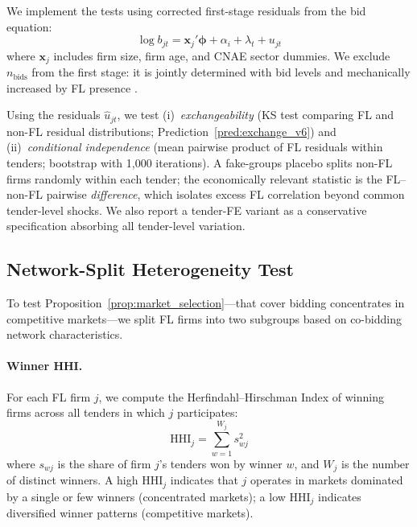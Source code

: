 We implement the \citet{bajari2003deciding} tests using corrected
first-stage residuals from the bid equation:
\begin{equation}
  \log b_{jt} = \mathbf{x}_j'\boldsymbol{\phi} + \alpha_i + \lambda_t
  + u_{jt}
  \label{eq:by_first_stage}
\end{equation}
where $\mathbf{x}_j$ includes firm size, firm age, and CNAE sector
dummies. We exclude $n_{\text{bids}}$ from the first stage: it is
jointly determined with bid levels and mechanically increased by FL
presence \citep[p.~978]{bajari2003deciding}.

Using the residuals $\hat{u}_{jt}$, we test (i)~\emph{exchangeability}
(KS test comparing FL and non-FL residual distributions;
Prediction~\ref{pred:exchange_v6}) and (ii)~\emph{conditional
independence} (mean pairwise product of FL residuals within tenders;
bootstrap with 1,000 iterations). A fake-groups placebo splits non-FL
firms randomly within each tender; the economically relevant statistic
is the FL--non-FL pairwise \emph{difference}, which isolates excess
FL correlation beyond common tender-level shocks. We also report a
tender-FE variant as a conservative specification absorbing all
tender-level variation.


\subsection{Network-Split Heterogeneity Test} %
\label{sec:empirical_network}

To test Proposition~\ref{prop:market_selection}---that cover bidding
concentrates in competitive markets---we split FL firms into two
subgroups based on co-bidding network characteristics.

\paragraph{Winner HHI.}
For each FL firm $j$, we compute the Herfindahl--Hirschman Index of
winning firms across all tenders in which $j$ participates:
\begin{equation}
  \text{HHI}_j = \sum_{w=1}^{W_j} s_{wj}^2
  \label{eq:winner_hhi}
\end{equation}
where $s_{wj}$ is the share of firm $j$'s tenders won by winner $w$,
and $W_j$ is the number of distinct winners. A high $\text{HHI}_j$
indicates that $j$ operates in markets dominated by a single or few
winners (concentrated markets); a low $\text{HHI}_j$ indicates
diversified winner patterns (competitive markets).

